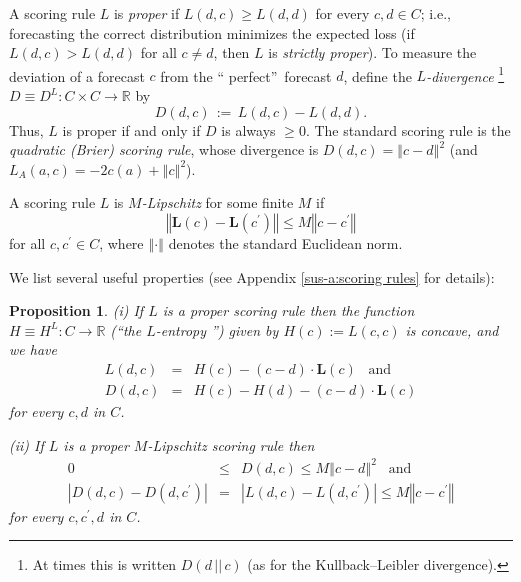 \documentclass[12pt,a4paper,notitlepage]{article}
\newtheorem{proposition}[theorem]{Proposition}
\begin{document}
A scoring rule $L$ is \emph{proper} if $L(d,c)\geq L(d,d)$ for every $c,d\in
C$; i.e., forecasting the correct distribution minimizes the expected loss
(if $L(d,c)>L(d,d)$ for all $c\neq d$, then $L$ is \emph{strictly proper}).
To measure the deviation of a forecast $c$ from the \textquotedblleft
perfect\textquotedblright\ forecast $d$, define the $L$\emph{-divergence}%
\footnote{%
At times this is written $D(d\,||\,c)$ (as for the Kullback--Leibler
divergence).} $D\equiv D^{L}:C\times C\rightarrow \mathbb{R}$ by%
\begin{equation}
D(d,c)\,:=\,L(d,c)-L(d,d).  \label{eq:D-le}
\end{equation}%
Thus, $L$ is proper if and only if $D$ is always $\geq 0.$ The standard
scoring rule is the \emph{quadratic (Brier) scoring rule}, whose divergence
is $D(d,c)=\left\Vert c-d\right\Vert ^{2}$ (and $L_{A}(a,c)=-2c(a)+\left%
\Vert c\right\Vert ^{2}$).

A scoring rule $L$ is $M$\emph{-Lipschitz} for some finite $M$ if%
\begin{equation*}
\left\Vert \mathbf{L}(c)-\mathbf{L}(c^{\prime })\right\Vert \leq M\left\Vert
c-c^{\prime }\right\Vert
\end{equation*}%
for all $c,c^{\prime }\in C$, where $\left\Vert \cdot \right\Vert $ denotes
the standard Euclidean norm.

We list several useful properties (see Appendix \ref{sus-a:scoring rules}
for details):

\begin{proposition}
\label{p:L}(i) If $L$ is a proper scoring rule then the function $H\equiv
H^{L}:C\rightarrow \mathbb{R}$ (\textquotedblleft the $L$-entropy%
\textquotedblright ) given by $H(c):=L(c,c)$ is concave, and we have 
\begin{eqnarray*}
L(d,c) &=&H(c)-(c-d)\cdot \mathbf{L}(c)\;\;\;\text{and} \\
D(d,c) &=&H(c)-H(d)-(c-d)\cdot \mathbf{L}(c)
\end{eqnarray*}%
for every $c,d$ in $C$.

(ii) If $L$ is a proper $M$-Lipschitz scoring rule then%
\begin{eqnarray}
0 &\leq &D(d,c)\leq M\left\Vert c-d\right\Vert ^{2}\;\;\;\text{and}
\label{eq:L} \\
\left\vert D(d,c)-D(d,c^{\prime })\right\vert &=&\left\vert
L(d,c)-L(d,c^{\prime })\right\vert \leq M\left\Vert c-c^{\prime }\right\Vert
\label{eq:D-D-L}
\end{eqnarray}%
for every $c,c^{\prime },d$ in $C$.
\end{proposition}
\end{document}
